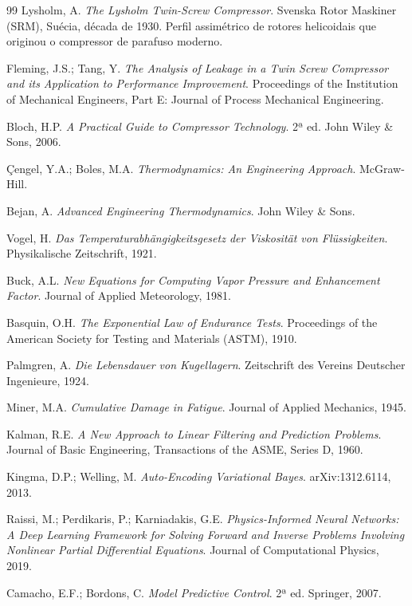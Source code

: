 \documentclass[12pt,a4paper]{article}
\numberwithin{equation}{section}
\numberwithin{table}{section}
\numberwithin{figure}{section}
\begin{document}
\begin{thebibliography}{99}
 Lysholm, A. \textit{The Lysholm Twin-Screw Compressor}. Svenska Rotor Maskiner (SRM), Suécia, década de 1930. Perfil assimétrico de rotores helicoidais que originou o compressor de parafuso moderno.

 Fleming, J.S.; Tang, Y. \textit{The Analysis of Leakage in a Twin Screw Compressor and its Application to Performance Improvement}. Proceedings of the Institution of Mechanical Engineers, Part E: Journal of Process Mechanical Engineering.

 Bloch, H.P. \textit{A Practical Guide to Compressor Technology}. 2ª ed. John Wiley \& Sons, 2006.

 Çengel, Y.A.; Boles, M.A. \textit{Thermodynamics: An Engineering Approach}. McGraw-Hill.

 Bejan, A. \textit{Advanced Engineering Thermodynamics}. John Wiley \& Sons.

 Vogel, H. \textit{Das Temperaturabhängigkeitsgesetz der Viskosität von Flüssigkeiten}. Physikalische Zeitschrift, 1921.

 Buck, A.L. \textit{New Equations for Computing Vapor Pressure and Enhancement Factor}. Journal of Applied Meteorology, 1981.

 Basquin, O.H. \textit{The Exponential Law of Endurance Tests}. Proceedings of the American Society for Testing and Materials (ASTM), 1910.

 Palmgren, A. \textit{Die Lebensdauer von Kugellagern}. Zeitschrift des Vereins Deutscher Ingenieure, 1924.

 Miner, M.A. \textit{Cumulative Damage in Fatigue}. Journal of Applied Mechanics, 1945.

 Kalman, R.E. \textit{A New Approach to Linear Filtering and Prediction Problems}. Journal of Basic Engineering, Transactions of the ASME, Series D, 1960.

 Kingma, D.P.; Welling, M. \textit{Auto-Encoding Variational Bayes}. arXiv:1312.6114, 2013.

 Raissi, M.; Perdikaris, P.; Karniadakis, G.E. \textit{Physics-Informed Neural Networks: A Deep Learning Framework for Solving Forward and Inverse Problems Involving Nonlinear Partial Differential Equations}. Journal of Computational Physics, 2019.

 Camacho, E.F.; Bordons, C. \textit{Model Predictive Control}. 2ª ed. Springer, 2007.


\end{thebibliography}
\end{document}
